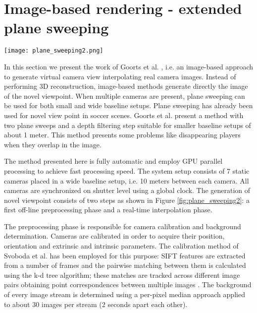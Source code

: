 \section{Image-based rendering - extended plane sweeping}


\begin{figure*}[htbp]
\centerline{\texttt{[image: plane\_sweeping2.png]}}
\caption{Overview of the extended plane sweeping method. Both the non real-time and real-time phase are shown \cite{05_plane_sweeping}.}
\label{fig:plane_sweeping2}
\end{figure*}

In this section we present the work of Goorts et al. \cite{05_plane_sweeping}, i.e. an image-based approach to generate 
virtual camera view interpolating real camera images.
Instead of performing 3D reconstruction, image-based methods generate directly the image of the novel viewpoint.
When multiple cameras are present, plane sweeping can be used \cite{05_plane_sweeping_yang} for both small and wide 
baseline setups.
Plane sweeping has already been used for novel view point in soccer scenes. Goorts et al. \cite{05_plane_sweeping_2013} 
present a method with two plane sweeps and a depth filtering step suitable for smaller baseline 
setups of about 1 meter. 
This method presents some problems like disappearing players
when they overlap in the image.

The method presented here is fully automatic and employ GPU
parallel processing to achieve fast processing speed.
The system setup consists of 7 static cameras placed in a
wide baseline setup, i.e. 10 meters between each camera.
All cameras are synchronized on shutter level using a global clock.
The generation of novel viewpoint consists of two steps as shown in Figure \ref{fig:plane_sweeping2}:
a first off-line preprocessing phase and a real-time interpolation phase. 

The preprocessing phase is responsible for camera calibration and background determination.
Cameras are calibrated in order to acquire their position, orientation and extrinsic and intrinsic parameters.
The calibration method of Svoboda et al. \cite{05_plane_sweeping_Svoboda} has been employed for this purpose:
SIFT features are extracted from a number of frames and the pairwise matching between them is calculated 
using the k-d tree algorithm; these matches are tracked across different image pairs obtaining point 
correspondences between multiple images \cite{05_plane_sweeping}.
The background of every image stream is determined using a per-pixel median approach applied to about 30 images
per stream (2 seconds apart each other).



